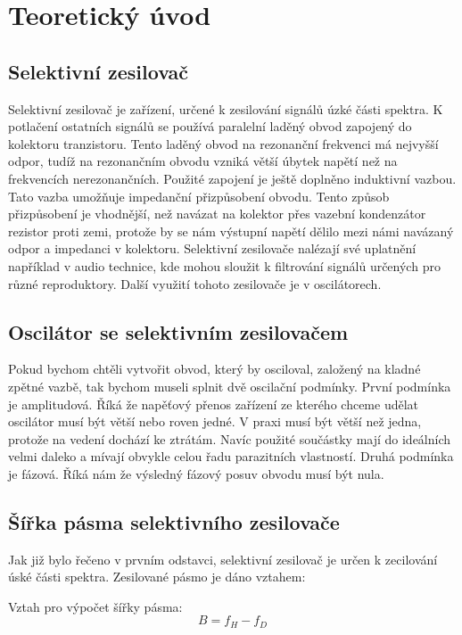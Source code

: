 \section*{Teoretický úvod}
		\subsection*{Selektivní zesilovač}
			\indent\indent
			Selektivní zesilovač je zařízení, určené k zesilování signálů úzké části spektra. K potlačení ostatních signálů se používá paralelní laděný obvod zapojený do kolektoru tranzistoru. Tento laděný obvod na rezonanční frekvenci má nejvyšší odpor, tudíž na rezonančním obvodu vzniká větší úbytek napětí než na frekvencích nerezonančních. Použité zapojení je ještě doplněno induktivní vazbou. Tato vazba umožňuje impedanční přizpůsobení obvodu. Tento způsob přizpůsobení je vhodnější, než navázat na kolektor přes vazební kondenzátor rezistor proti zemi, protože by se nám výstupní napětí dělilo mezi námi navázaný odpor a impedanci v kolektoru. Selektivní zesilovače nalézají své uplatnění například v audio technice, kde mohou sloužit k filtrování signálů určených pro různé reproduktory. Další využití tohoto zesilovače je v oscilátorech.
			
		\subsection*{Oscilátor se selektivním zesilovačem}
			\indent\indent
			Pokud bychom chtěli vytvořit obvod, který by osciloval, založený na kladné zpětné vazbě, tak bychom museli splnit dvě oscilační podmínky. První podmínka je amplitudová. Říká že napěťový přenos zařízení ze kterého chceme udělat oscilátor musí být větší nebo roven jedné. V praxi musí být větší než jedna, protože na vedení dochází ke ztrátám. Navíc použité součástky mají do ideálních velmi daleko a mívají obvykle celou řadu parazitních vlastností. Druhá podmínka je fázová. Říká nám že výsledný fázový posuv obvodu musí být nula.
			
		\subsection*{Šířka pásma selektivního zesilovače}
			\indent\indent
			Jak již bylo řečeno v prvním odstavci, selektivní zesilovač je určen k zecilování úské části spektra. Zesilované pásmo je dáno vztahem:
						
			Vztah pro výpočet šířky pásma:
			\begin{equation}
  				B = f_H - f_D
  			\end{equation}		
		
